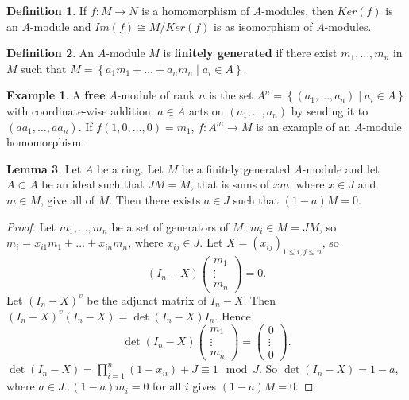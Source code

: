 \documentclass{article}
\newcommand{\rb}[1]{\left( #1 \right)}
\newcommand{\cb}[1]{\left\{ #1 \right\}}
\theoremstyle{definition}\newtheorem{definition}{Definition}[section]
\theoremstyle{definition}\newtheorem{remark}[definition]{Remark}
\theoremstyle{definition}\newtheorem*{example}{Example}
\theoremstyle{definition}\newtheorem*{note}{Note}
\newtheorem{lemma}[definition]{Lemma}
\begin{document}
\begin{definition}
If $ f : M \to N $ is a homomorphism of $ A $-modules, then $ Ker\rb{f} $ is an $ A $-module and $ Im\rb{f} \cong M / Ker\rb{f} $ is as isomorphism of $ A $-modules.
\end{definition}

\begin{definition}
An $ A $-module $ M $ is \textbf{finitely generated} if there exist $ m_1, \dots, m_n $ in $ M $ such that $ M = \cb{a_1m_1 + \dots + a_nm_n \mid a_i \in A} $.
\end{definition}

\begin{example}
A \textbf{free} $ A $-module of rank $ n $ is the set $ A^n = \cb{\rb{a_1, \dots, a_n} \mid a_i \in A} $ with coordinate-wise addition. $ a \in A $ acts on $ \rb{a_1, \dots, a_n} $ by sending it to $ \rb{aa_1, \dots, aa_n} $. If $ f\rb{1, 0, \dots, 0} = m_1 $, $ f : A^m \to M $ is an example of an $ A $-module homomorphism.
\end{example}

\begin{lemma}
\label{lem:8.7}
Let $ A $ be a ring. Let $ M $ be a finitely generated $ A $-module and let $ A \subset A $ be an ideal such that $ JM = M $, that is sums of $ xm $, where $ x \in J $ and $ m \in M $, give all of $ M $. Then there exists $ a \in J $ such that $ \rb{1 - a}M = 0 $.
\end{lemma}

\begin{proof}
Let $ m_1, \dots, m_n $ be a set of generators of $ M $. $ m_i \in M = JM $, so $ m_i = x_{i1}m_1 + \dots + x_{in}m_n $, where $ x_{ij} \in J $. Let $ X = \rb{x_{ij}}_{1 \le i, j \le n} $, so
$$ \rb{I_n - X}\begin{pmatrix}
m_1 \\
\vdots \\
m_n
\end{pmatrix} = 0. $$
Let $ \rb{I_n - X}^v $ be the adjunct matrix of $ I_n - X $. Then $ \rb{I_n - X}^v\rb{I_n - X} = \det\rb{I_n - X}I_n $. Hence
$$ \det\rb{I_n - X}\begin{pmatrix}
m_1 \\
\vdots \\
m_n
\end{pmatrix} = \begin{pmatrix}
0 \\
\vdots \\
0
\end{pmatrix}. $$
$ \det\rb{I_n - X} = \prod_{i = 1}^n \rb{1 - x_{ii}} + J \equiv 1 \mod J $. So $ \det\rb{I_n - X} = 1 - a $, where $ a \in J $. $ \rb{1 - a}m_i = 0 $ for all $ i $ gives $ \rb{1 - a}M = 0 $.
\end{proof}
\end{document}
